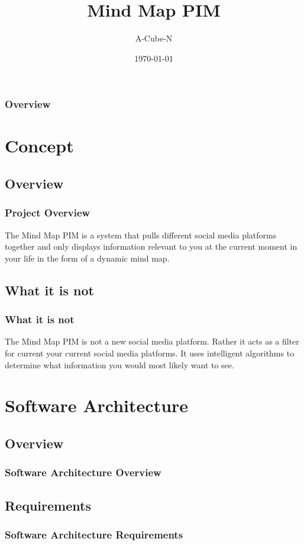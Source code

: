 \documentclass{beamer}
\title[Mind Map PIM]{Mind Map PIM}
\author{A-Cube-N}
\institute[UP]{
	Department of Computer Science, University of Pretoria
}
\date{\today}
\begin{document}
\begin{frame}
	\titlepage
\end{frame}

\begin{frame}
	\frametitle{Overview}
	\tableofcontents
\end{frame}

\section{Concept}
	\subsection{Overview}
		\begin{frame}
		\frametitle{Project Overview}
		The Mind Map PIM is a system that pulls different social media platforms together and only displays information relevant to you at the current moment in your life in the form of a dynamic mind map.
		\end{frame}
	
	\subsection{What it is not}
		\begin{frame}
		\frametitle{What it is not}
		The Mind Map PIM is not a new social media platform. Rather it acts as a filter for current your current social media platforms. It uses intelligent algorithms to determine what information you would most likely want to see.
		\end{frame}
		
\section{Software Architecture}
	\subsection{Overview}
		\begin{frame}
		\frametitle{Software Architecture Overview}
		
		\end{frame}
		
	\subsection{Requirements}
		\begin{frame}
		\frametitle{Software Architecture Requirements}
		
		\end{frame}
		
\end{document}
